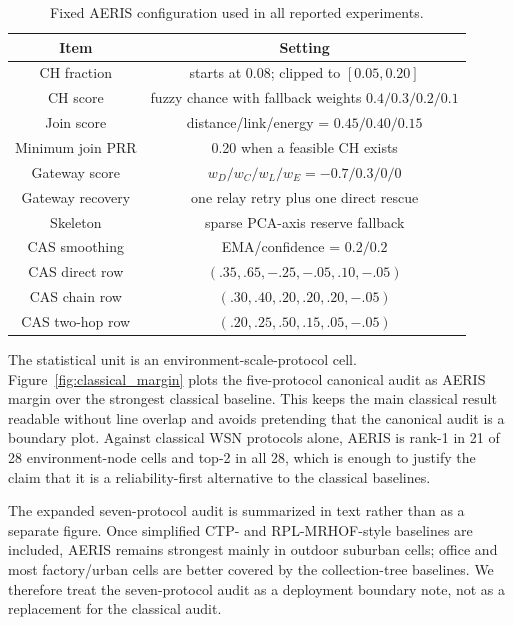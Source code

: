 \documentclass[conference]{IEEEtran}
\begin{document}
\begin{table}[t]
\caption{Fixed AERIS configuration used in all reported experiments.}
\label{tbl:aeris_params}
\centering
\scriptsize
\setlength{\tabcolsep}{2pt}
\begin{tabular*}{\columnwidth}{@{\extracolsep{\fill}}cc@{}}
\toprule
Item & Setting \\
\midrule
CH fraction & starts at 0.08; clipped to $[0.05,0.20]$ \\
CH score & fuzzy chance with fallback weights $0.4/0.3/0.2/0.1$ \\
Join score & distance/link/energy = $0.45/0.40/0.15$ \\
Minimum join PRR & 0.20 when a feasible CH exists \\
Gateway score & $w_D/w_C/w_L/w_E=-0.7/0.3/0/0$ \\
Gateway recovery & one relay retry plus one direct rescue \\
Skeleton & sparse PCA-axis reserve fallback \\
CAS smoothing & EMA/confidence = $0.2/0.2$ \\
CAS direct row & $(.35,.65,-.25,-.05,.10,-.05)$ \\
CAS chain row & $(.30,.40,.20,.20,.20,-.05)$ \\
CAS two-hop row & $(.20,.25,.50,.15,.05,-.05)$ \\
\bottomrule
\end{tabular*}
\end{table}

The statistical unit is an environment-scale-protocol cell. Figure~\ref{fig:classical_margin} plots the five-protocol canonical audit as AERIS margin over the strongest classical baseline. This keeps the main classical result readable without line overlap and avoids pretending that the canonical audit is a boundary plot. Against classical WSN protocols alone, AERIS is rank-1 in 21 of 28 environment-node cells and top-2 in all 28, which is enough to justify the claim that it is a reliability-first alternative to the classical baselines.

The expanded seven-protocol audit is summarized in text rather than as a separate figure. Once simplified CTP- and RPL-MRHOF-style baselines are included, AERIS remains strongest mainly in outdoor suburban cells; office and most factory/urban cells are better covered by the collection-tree baselines. We therefore treat the seven-protocol audit as a deployment boundary note, not as a replacement for the classical audit.
\end{document}
